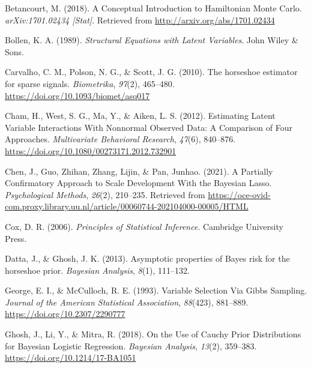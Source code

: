 \documentclass[
  man, donotrepeattitle,floatsintext]{apa6}
\newlength{\cslhangindent}
\newlength{\cslentryspacingunit} %
\newenvironment{CSLReferences}[2] %
 {%
  \setlength{\parindent}{0pt}
  \ifodd #1
  \let\oldpar\par
  \def\par{\hangindent=\cslhangindent\oldpar}
  \fi
  \setlength{\parskip}{#2\cslentryspacingunit}
 }%
 {}
\begin{document}
\hypertarget{refs}{}
\begin{CSLReferences}{1}{0}
\leavevmode{}%
Betancourt, M. (2018). A {Conceptual} {Introduction} to {Hamiltonian} {Monte} {Carlo}. \emph{arXiv:1701.02434 {[}Stat{]}}. Retrieved from \url{http://arxiv.org/abs/1701.02434}

\leavevmode{}%
Bollen, K. A. (1989). \emph{Structural {Equations} with {Latent} {Variables}}. John Wiley \& Sons.

\leavevmode{}%
Carvalho, C. M., Polson, N. G., \& Scott, J. G. (2010). The horseshoe estimator for sparse signals. \emph{Biometrika}, \emph{97}(2), 465--480. \url{https://doi.org/10.1093/biomet/asq017}

\leavevmode{}%
Cham, H., West, S. G., Ma, Y., \& Aiken, L. S. (2012). Estimating {Latent} {Variable} {Interactions} {With} {Nonnormal} {Observed} {Data}: {A} {Comparison} of {Four} {Approaches}. \emph{Multivariate Behavioral Research}, \emph{47}(6), 840--876. \url{https://doi.org/10.1080/00273171.2012.732901}

\leavevmode{}%
Chen, J., Guo, Zhihan, Zhang, Lijin, \& Pan, Junhao. (2021). A {Partially} {Confirmatory} {Approach} to {Scale} {Development} {With} the {Bayesian} {Lasso}. \emph{Psychological Methods}, \emph{26}(2), 210--235. Retrieved from \url{https://oce-ovid-com.proxy.library.uu.nl/article/00060744-202104000-00005/HTML}

\leavevmode{}%
Cox, D. R. (2006). \emph{Principles of {Statistical} {Inference}}. Cambridge University Press.

\leavevmode{}%
Datta, J., \& Ghosh, J. K. (2013). Asymptotic properties of {Bayes} risk for the horseshoe prior. \emph{Bayesian Analysis}, \emph{8}(1), 111--132.

\leavevmode{}%
George, E. I., \& McCulloch, R. E. (1993). Variable {Selection} {Via} {Gibbs} {Sampling}. \emph{Journal of the American Statistical Association}, \emph{88}(423), 881--889. \url{https://doi.org/10.2307/2290777}

\leavevmode{}%
Ghosh, J., Li, Y., \& Mitra, R. (2018). On the {Use} of {Cauchy} {Prior} {Distributions} for {Bayesian} {Logistic} {Regression}. \emph{Bayesian Analysis}, \emph{13}(2), 359--383. \url{https://doi.org/10.1214/17-BA1051}


\end{CSLReferences}
\end{document}
